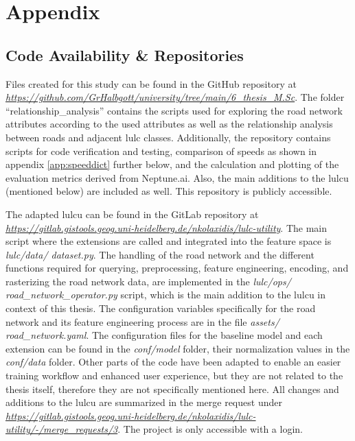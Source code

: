 \chapter{Appendix}
\label{Appendix}

\section{Code Availability \& Repositories}
\label{app:code}

Files created for this study can be found in the GitHub repository at \emph{\url{https://github.com/GrHalbgott/university/tree/main/6_thesis_M.Sc}}. The folder \enquote{relationship\_analysis} contains the scripts used for exploring the road network attributes according to the used attributes as well as the relationship analysis between roads and adjacent \gls{lulc} classes. Additionally, the repository contains scripts for code verification and testing, comparison of speeds as shown in appendix \ref{app:speeddict} further below, and the calculation and plotting of the evaluation metrics derived from Neptune.ai. Also, the main additions to the \gls{lulcu} (mentioned below) are included as well. This repository is publicly accessible.

The adapted \gls{lulcu} can be found in the GitLab repository at \emph{\url{https://gitlab.gistools.geog.uni-heidelberg.de/nkolaxidis/lulc-utility}}. The main script where the extensions are called and integrated into the feature space is \emph{lulc/data/ dataset.py}. The handling of the road network and the different functions required for querying, preprocessing, feature engineering, encoding, and rasterizing the road network data, are implemented in the \emph{lulc/ops/ road\_network\_operator.py} script, which is the main addition to the \gls{lulcu} in context of this thesis. The configuration variables specifically for the road network and its feature engineering process are in the file \emph{assets/ road\_network.yaml}. The configuration files for the baseline model and each extension can be found in the \emph{conf/model} folder, their normalization values in the \emph{conf/data} folder. Other parts of the code have been adapted to enable an easier training workflow and enhanced user experience, but they are not related to the thesis itself, therefore they are not specifically mentioned here. All changes and additions to the \gls{lulcu} are summarized in the merge request under \emph{\url{https://gitlab.gistools.geog.uni-heidelberg.de/nkolaxidis/lulc-utility/-/merge_requests/3}}. The project is only accessible with a login.

